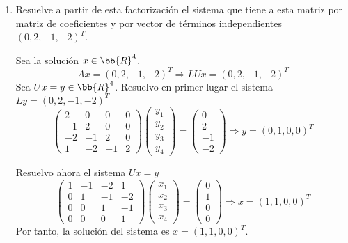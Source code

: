 \begin{ejercicio}
\begin{enumerate}
    \item Resuelve a partir de esta factorización el sistema que tiene a esta matriz por matriz de coeficientes y por vector de términos independientes $(0, 2, -1, -2)^T$.

    Sea la solución $x\in\bb{R}^4$.
    \begin{equation*}
        Ax = (0, 2, -1, -2)^T \Longrightarrow LUx = (0, 2, -1, -2)^T
    \end{equation*}
    Sea $Ux = y \in \bb{R}^4$. Resuelvo en primer lugar el sistema $Ly=(0, 2, -1, -2)^T$
    \begin{equation*}
        \left(
        \begin{array}{cccc}
            2 & 0 & 0 & 0\\
            -1 & 2 & 0 & 0\\
            -2 & -1 & 2 & 0\\
            1 & -2 & -1 & 2
        \end{array}\right) \left(\begin{array}{c}
            y_1 \\
            y_2 \\
            y_3 \\
            y_4
        \end{array} \right)       
        =\left( \begin{array}{c}
             0 \\
             2 \\
             -1 \\
             -2
        \end{array}\right) \Longrightarrow y = (0, 1, 0, 0)^T
    \end{equation*}

    Resuelvo ahora el sistema $Ux=y$
    \begin{equation*}
        \left(
        \begin{array}{cccc}
            1 & -1 & -2 & 1\\
            0 & 1 & -1 & -2\\
            0 & 0 & 1 & -1\\
            0 & 0 & 0 & 1
        \end{array}\right) \left(\begin{array}{c}
            x_1 \\
            x_2 \\
            x_3 \\
            x_4
        \end{array} \right)       
        =\left( \begin{array}{c}
             0 \\
             1 \\
             0 \\
             0
        \end{array}\right) \Longrightarrow x = (1, 1, 0, 0)^T
    \end{equation*}
    Por tanto, la solución del sistema es $x = (1, 1, 0, 0)^T$.   
    

\end{enumerate}
\end{ejercicio}
